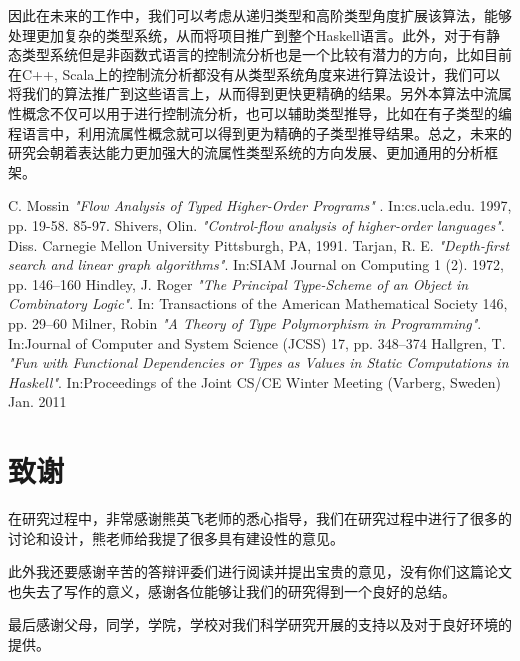 \documentclass[UTF8, colorlinks]{pkuthss}
\begin{document}
	因此在未来的工作中，我们可以考虑从递归类型和高阶类型角度扩展该算法，能够处理更加复杂的类型系统，从而将项目推广到整个Haskell语言。此外，对于有静态类型系统但是非函数式语言的控制流分析也是一个比较有潜力的方向，比如目前在C++, Scala上的控制流分析都没有从类型系统角度来进行算法设计，我们可以将我们的算法推广到这些语言上，从而得到更快更精确的结果。另外本算法中流属性概念不仅可以用于进行控制流分析，也可以辅助类型推导，比如在有子类型的编程语言中，利用流属性概念就可以得到更为精确的子类型推导结果。总之，未来的研究会朝着表达能力更加强大的流属性类型系统的方向发展、更加通用的分析框架。
	
	\begin{thebibliography}{1}
		 C. Mossin {\em "Flow Analysis of Typed Higher-Order Programs"} . In:cs.ucla.edu. 1997, pp. 19-58. 85-97.
		 Shivers, Olin. {\em "Control-flow analysis of higher-order languages"}. Diss. Carnegie Mellon University Pittsburgh, PA, 1991.
		 Tarjan, R. E. {\em  "Depth-first search and linear graph algorithms"}. In:SIAM Journal on Computing 1 (2). 1972, pp. 146–160
		 Hindley, J. Roger {\em "The Principal Type-Scheme of an Object in Combinatory Logic"}. In: Transactions of the American Mathematical Society 146, pp. 29–60
		 Milner, Robin {\em "A Theory of Type Polymorphism in Programming"}. In:Journal of Computer and System Science (JCSS) 17, pp. 348–374
		 Hallgren, T.  {\em "Fun with Functional Dependencies or Types as Values in Static Computations in Haskell"}. In:Proceedings of the Joint CS/CE Winter Meeting (Varberg, Sweden) Jan. 2011
	\end{thebibliography}
	
	\backmatter
	\chapter{致谢}
	在研究过程中，非常感谢熊英飞老师的悉心指导，我们在研究过程中进行了很多的讨论和设计，熊老师给我提了很多具有建设性的意见。
	
	此外我还要感谢辛苦的答辩评委们进行阅读并提出宝贵的意见，没有你们这篇论文也失去了写作的意义，感谢各位能够让我们的研究得到一个良好的总结。
	
	最后感谢父母，同学，学院，学校对我们科学研究开展的支持以及对于良好环境的提供。
	
\end{document}
